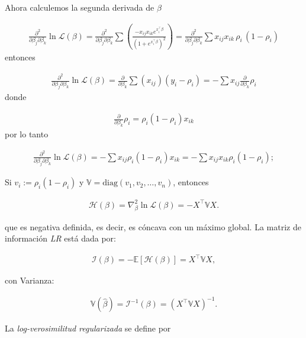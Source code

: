 \documentclass[12pt]{article}
\begin{document}
Ahora calculemos la segunda derivada de \(\beta\)

\begin{eqnarray*}
\frac{\partial^2}{\partial \beta_j \partial \beta_k} \ln \mathcal{L}(\beta)= \frac{\partial^2}{\partial \beta_j \partial \beta_k}\sum \left( \frac{-x_{ij} x_{ik} e^{x_i^\top \beta}}{(1 + e^{x_i^\top \beta})^2} \right)= \frac{\partial^2}{\partial \beta_j \partial \beta_k}\sum x_{ij} x_{ik} \, \rho_i \, (1 - \rho_i)
\end{eqnarray*}
entonces

\begin{eqnarray*}
\frac{\partial^2}{\partial \beta_j \partial \beta_k} \ln \mathcal{L}(\beta)= \frac{\partial}{\partial \beta_k} \sum (x_{ij}) (y_i - \rho_i)= -\sum x_{ij} \frac{\partial}{\partial \beta_k} \rho_i
\end{eqnarray*}
donde

\begin{eqnarray*}
\frac{\partial}{\partial \beta_k} \rho_i = \rho_i (1 - \rho_i) x_{ik}
\end{eqnarray*}
por lo tanto

\begin{eqnarray*}
\frac{\partial^2}{\partial \beta_j \partial \beta_k} \ln \mathcal{L}(\beta)= -\sum x_{ij} \rho_i (1 - \rho_i) x_{ik}= -\sum x_{ij} x_{ik} \rho_i (1 - \rho_i);
\end{eqnarray*}


Si $v_i := \rho_i (1 - \rho_i)$ y $\mathbb{V} = \mathrm{diag}(v_1, v_2, \dots, v_n)$, entonces

\begin{eqnarray*}
\mathcal{H}(\beta) = \nabla^2_\beta \ln \mathcal{L}(\beta) = -X^\top \mathbb{V} X.
\end{eqnarray*}

que es negativa definida, es decir, es cóncava con un máximo global. La matriz de información \textit{LR} está dada por:

\begin{eqnarray}
\mathcal{I}(\beta) = -\mathbb{E}[\mathcal{H}(\beta)] = X^\top \mathbb{V} X,
\end{eqnarray}

con Varianza:

\begin{eqnarray}
\mathbb{V}(\hat{\beta}) = \mathcal{I}^{-1}(\beta) = (X^\top \mathbb{V} X)^{-1}.
\end{eqnarray}

La \textit{log-verosimilitud regularizada} se define por
\end{document}
